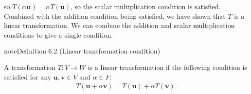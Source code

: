 \documentclass[letterpaper,10pt,english]{jupyterBook}
\begin{document}
\sphinxAtStartPar
so \(T(\alpha \mathbf{u}) = \alpha T(\mathbf{u})\), so the scalar multiplication condition is satisfied. Combined with the addition condition being satisfied, we have shown that \(T\) is a linear transformation. We can combine the addition and scalar multiplication conditions to give a single condition.
\label{_pages/6.0_Linear_transformations:linear-transformation-condition -definition}
\begin{sphinxadmonition}{note}{Definition 6.2 (Linear transformation condition)}



\sphinxAtStartPar
A transformation \(T : V \to W\) is a linear transformation if the following condition is satisfied for any \(\mathbf{u}, \mathbf{v} \in V\) and \(\alpha \in F\):
\begin{equation}\label{equation:_pages/6.0_Linear_transformations:linear-transformation-condition-equation}
\begin{split} T(\mathbf{u} + \alpha \mathbf{v}) = T(\mathbf{u}) + \alpha T(\mathbf{v}). \end{split}
\end{equation}\end{sphinxadmonition}
\label{_pages/6.0_Linear_transformations:linear-transformation-example}
\end{document}

